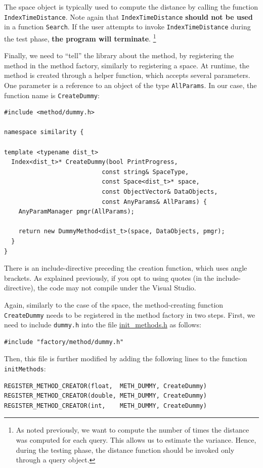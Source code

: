 \documentclass[runningheads,a4paper]{llncs}
\newcommand{\replocfile}{https://github.com/searchivarius/NonMetricSpaceLib/blob/develop/}
\newcommand{\ttt}[1]{\texttt{#1}}
\begin{document}
The space object is typically used to compute the distance by calling
the function \ttt{IndexTimeDistance}.
Note again that \ttt{IndexTimeDistance} \textbf{should not be used} in a function
\ttt{Search}. 
If the user attempts to invoke \ttt{IndexTimeDistance} during the test phase,
\textbf{the program will terminate}.
\footnote{As noted previously, we want to compute the number of times
the distance was computed for each query. This allows us to estimate the variance.
Hence, during the testing phase, the distance function should be invoked only through
a query object.}


Finally, we need to ``tell'' the library about the method,
by registering the method in the method factory,
similarly to registering a space.
At runtime, the method is created through a helper function,
which accepts several parameters.
One parameter is a reference to an object of the type \ttt{AllParams}.
In our case, the function name is \ttt{CreateDummy}:

\begin{verbatim}
#include <method/dummy.h>

namespace similarity {

template <typename dist_t>
  Index<dist_t>* CreateDummy(bool PrintProgress,
                           const string& SpaceType,
                           const Space<dist_t>* space,
                           const ObjectVector& DataObjects,
                           const AnyParams& AllParams) {
    AnyParamManager pmgr(AllParams);

    return new DummyMethod<dist_t>(space, DataObjects, pmgr);
  }
}
\end{verbatim}
There is an include-directive preceding
the creation function, which uses angle brackets.
As explained previously, if you opt to using quotes (in the include-directive),
the code may not compile under the Visual Studio.

Again, similarly to the case of the space, 
the method-creating function \ttt{CreateDummy} needs
to be registered in the method factory in two steps.
First, we need to include \ttt{dummy.h} into the file
\href{\replocfile similarity_search/include/factory/init_methods.h}{init\_methods.h} as follows:
\begin{verbatim}
#include "factory/method/dummy.h"
\end{verbatim}
Then, this file is further modified by adding the following lines to the function \ttt{initMethods}:
\begin{verbatim}
REGISTER_METHOD_CREATOR(float,  METH_DUMMY, CreateDummy)
REGISTER_METHOD_CREATOR(double, METH_DUMMY, CreateDummy)
REGISTER_METHOD_CREATOR(int,    METH_DUMMY, CreateDummy)
\end{verbatim}
\end{document}
